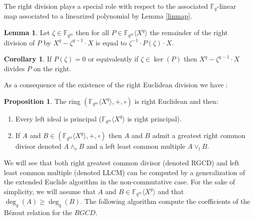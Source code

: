 \documentclass{article}
\newcommand{\tmop}[1]{#1}          %
\theoremstyle{definition}
\newtheorem{proposition}[theorem]{Proposition}
\newtheorem{lemma}[theorem]{Lemma}
\newtheorem{corollary}{Corollary}
\begin{document}
\noindent The right division plays a special role with respect to the associated
$\mathbb{F}_q$-linear map associated to a linearized polynomial by Lemma
\ref{linmap}.

\begin{lemma}
      \label{lemeval}Let $\zeta \in \mathbb{F}_{q^m}$ then for all $P \in
            \mathbb{F}_{q^m} \langle X^q \rangle$ the remainder of the right
      division of $P$ by $X^q - \zeta^{q - 1} \cdot X$ is equal to $ \zeta^{-1}\cdot P (\zeta)
            \cdot X$.
\end{lemma}

\begin{corollary}
      If $P (\zeta) = 0$ or equivalently if $\zeta \in \ker (P)$ then $X^q -
            \zeta^{q - 1} \cdot X$ divides $P$ on the right.
\end{corollary}

\noindent As a consequence of the existence of the right Euclidean division we have :

\begin{proposition}
      The ring $(\mathbb{F}_{q^m} \langle X^q \rangle, +, \circ)$ is right
      Euclidean and then:
      \begin{enumerate}
            \item Every left ideal is principal ($\mathbb{F}_{q^m} \langle X^q
                        \rangle$ is right principal).

            \item If $A$ and $B \in (\mathbb{F}_{q^m} \langle X^q \rangle, +, \circ)$
                  then $A$ and $B$ admit a greatest right common divisor denoted $A \wedge_r
                        B$ and a left least common multiple $A \vee_l B$.
      \end{enumerate}
\end{proposition}

\noindent We will see that both right greatest common divisor (denoted RGCD) and left
least common multiple (denoted LLCM) can be computed by a generalization of the
extended Euclide algorithm in the non-commutative case. For the sake of
simplicity, we will assume that $A$ and $B \in \mathbb{F}_{q^m} \langle X^q
      \rangle$ and that $\deg_q(A) \geqslant \deg_q(B)$. The
following algorithm compute the coefficients of the B{\'e}zout relation for
the $\tmop{RGCD}$.
\end{document}
